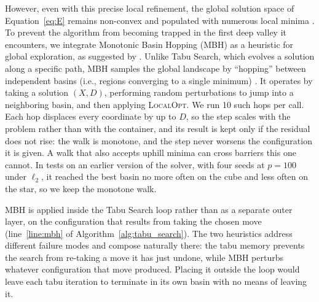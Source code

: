 \documentclass[preprint,12pt]{elsarticle}
\theoremstyle{remark}
\begin{document}
However, even with this precise local refinement, the global solution space of
Equation~\ref{eq:E} remains non-convex and populated with numerous local minima
\citep{lai2024}. To prevent the algorithm from becoming trapped in the first
deep valley it encounters, we integrate Monotonic Basin Hopping (\textsc{MBH})
as a heuristic for global exploration, as suggested by \citet{lai2024}. Unlike
Tabu Search, which evolves a solution along a specific path, \textsc{MBH}
samples the global landscape by ``hopping'' between independent basins (i.e.,
regions converging to a single minimum) \citep{back2013}. It operates by taking
a solution $(X,D)$, performing random perturbations to jump into a neighboring
basin, and then applying \textsc{LocalOpt}. We run 10 such hops per call. Each
hop displaces every coordinate by up to $D$, so the step scales with the problem
rather than with the container, and its result is kept only if the residual does
not rise: the walk is monotone, and the step never worsens the configuration it
is given. A walk that also accepts uphill minima can cross barriers this one
cannot. In tests on an earlier version of the solver, with four seeds at $p =
100$ under $\ell_2$, it reached the best basin no more often on the cube and
less often on the star, so we keep the monotone walk.

\textsc{MBH} is applied inside the Tabu Search loop rather than as a separate
outer layer, on the configuration that results from taking the chosen move
(line~\ref{line:mbh} of Algorithm~\ref{alg:tabu_search}). The two heuristics
address different failure modes and compose naturally there: the tabu memory
prevents the search from re-taking a move it has just undone, while \textsc{MBH}
perturbs whatever configuration that move produced. Placing it outside the loop
would leave each tabu iteration to terminate in its own basin with no means of
leaving it.
\end{document}
